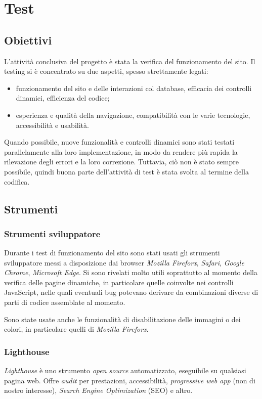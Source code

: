\section{Test}
\label{test}

\subsection{Obiettivi}
\label{test-obiettivi}

L'attività conclusiva del progetto è stata la verifica del funzionamento del sito. Il testing si è concentrato su due aspetti, spesso strettamente legati: 
\begin{itemize}
	\item funzionamento del sito e delle interazioni col database, efficacia dei controlli dinamici, efficienza del codice;
	\item esperienza e qualità della navigazione, compatibilità con le varie tecnologie, accessibilità e usabilità.
\end{itemize}
Quando possibile, nuove funzionalità e controlli dinamici sono stati testati parallelamente alla loro implementazione, in modo da rendere più rapida la rilevazione degli errori e la loro correzione. Tuttavia, ciò non è stato sempre possibile, quindi buona parte dell'attività di test è stata svolta al termine della codifica.

\subsection{Strumenti}
\label{test-strumenti}

\subsubsection{Strumenti sviluppatore}
\label{test-strumenti-sviluppatore}
Durante i test di funzionamento del sito sono stati usati gli strumenti sviluppatore messi a disposizione dai browser \textit{Mozilla Fireforx}, \textit{Safari}, \textit{Google Chrome}, \textit{Microsoft Edge}. Si sono rivelati molto utili soprattutto al momento della verifica delle pagine dinamiche, in particolare quelle coinvolte nei controlli JavaScript, nelle quali eventuali bug potevano derivare da combinazioni diverse di parti di codice assemblate al momento.

Sono state usate anche le funzionalità di disabilitazione delle immagini o dei colori, in particolare quelli di \textit{Mozilla Fireforx}.


\subsubsection{Lighthouse}
\label{test-strumenti-lighthouse}
\textit{Lighthouse} è uno strumento \textit{open source} automatizzato, eseguibile su qualsiasi pagina web. Offre \textit{audit} per prestazioni, accessibilità, \textit{progressive web app} (non di nostro interesse), \textit{Search Engine Optimization} (SEO) e altro.

